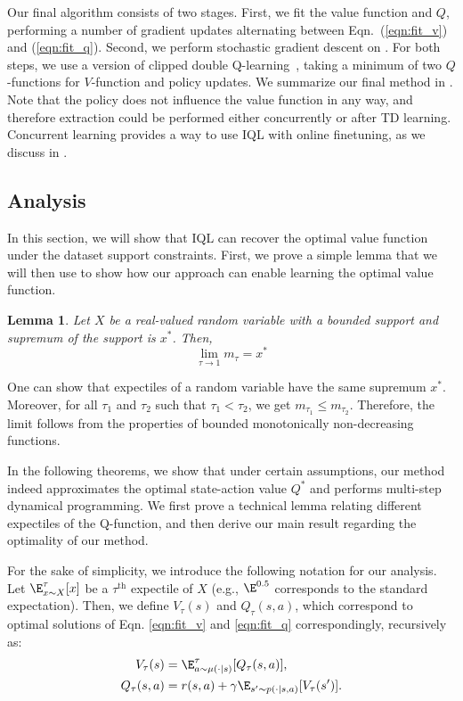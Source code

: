 \documentclass{article} %
\newtheorem{lemma}[theorem]{Lemma}
\newenvironment{sproof}{%
  \renewcommand{\proofname}{ Proof Sketch}\proof}{\endproof}
\def\ourname{IQL\xspace}
\begin{document}
Our final algorithm consists of two stages. First, we fit the value function and $Q$, performing a number of gradient updates alternating between Eqn.~(\ref{eqn:fit_v}) and (\ref{eqn:fit_q}). Second, we perform stochastic gradient descent on .
For both steps, we use a version of clipped double Q-learning~\citep{fujimoto2018addressing}, taking a minimum of two $Q$-functions for $V$-function and policy updates.
We summarize our final method in . Note that the policy does not influence the value function in any way, and therefore extraction could be performed either concurrently or after TD learning. Concurrent learning provides a way to use \ourname with online finetuning, as we discuss in .

\subsection{Analysis}

\label{sec:analysis}


In this section, we will show that \ourname can recover the optimal value function under the dataset support constraints.
First, we prove a simple lemma that we will then use to show how our approach can enable learning the optimal value function.
\begin{lemma}
\label{lem:1}
Let $X$ be a real-valued random variable with a bounded support
and supremum of the support is $x^*$. Then,
$$
\lim_{\tau\rightarrow1} m_\tau = x^*
$$
\end{lemma}
\begin{sproof}
One can show that expectiles of a random variable have the same supremum $x^*$. Moreover, for all $\tau_1$ and $\tau_2$ such that $\tau_1 < \tau_2$, we get $m_{\tau_1} \le m_{\tau_2}$. Therefore, the limit follows from the properties of bounded monotonically non-decreasing functions.
\end{sproof}

In the following theorems, we show that under certain assumptions, our method indeed approximates the optimal state-action value $Q^*$ and performs multi-step dynamical programming.
We first prove a technical lemma relating different expectiles of the Q-function, and then derive our main result regarding the optimality of our method.

For the sake of simplicity, we introduce the following notation for our analysis. Let $\E^\tau_{x\sim X}[x]$ be a $\tau^\text{th}$ expectile of $X$ (e.g., $\E^{0.5}$ corresponds to the standard expectation). Then, we define $V_{\tau}(s)$ and $Q_\tau(s, a)$, which correspond to optimal solutions of Eqn. \ref{eqn:fit_v} and \ref{eqn:fit_q} correspondingly, recursively as:
\begin{align*}
    V_\tau(s) &= \E^\tau_{a\sim \mu(\cdot|s)} [Q_\tau(s, a)], \\
    Q_\tau(s,a)&=r(s,a)+\gamma\E_{s'\sim p(\cdot|s,a)}[V_\tau(s')].
\end{align*}
\end{document}
